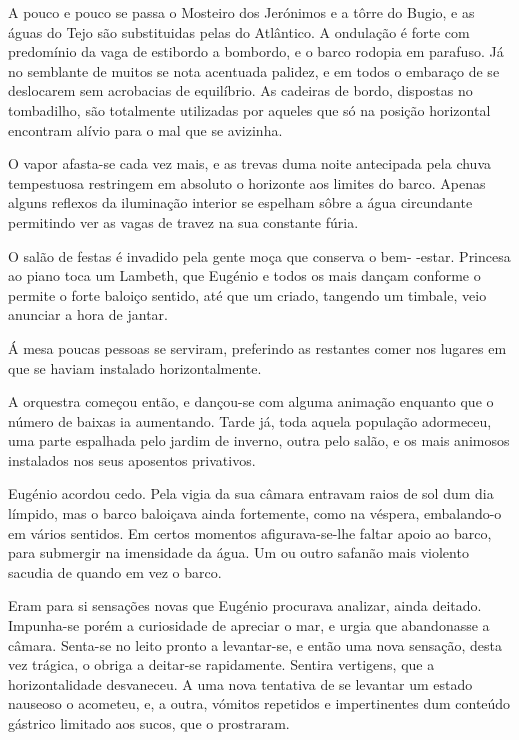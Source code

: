 \documentclass[9pt]{article}
\begin{document}
A pouco e pouco se passa o Mosteiro dos Jerónimos e a tôrre do Bugio, e
as águas do Tejo são substituidas pelas do Atlântico. A ondula\-ção é forte
com predomínio da vaga de estibordo a bombordo, e o barco rodopia em parafuso. Já no semblante de muitos se nota acen\-tua\-da palidez, e em todos o embaraço de se deslocarem sem acrobacias de equilíbrio. As cadeiras de bordo,
dispostas no tombadi\-lho, são totalmente utilizadas por aqueles que só na posi\-ção horizontal encontram alívio para o mal que se avizinha.

O vapor afasta-se cada vez mais, e as trevas duma noite antecipada pela
chuva tempestuosa restringem em absoluto o horizonte aos limites do barco.
Apenas alguns reflexos da ilumina\-ção interior se espe\-lham sôbre a água circundante permitindo ver as vagas de travez na sua constante fúria.

O salão de festas é invadido pela gente moça que conserva o bem- -estar. %
Princesa ao piano toca um Lambeth, que Eugé\-nio e todos os mais dan\-çam conforme o permite o forte baloiço sentido, até que um criado, tangendo um timbale,
veio anunciar a hora de jantar.

Á mesa poucas pessoas se serviram, preferindo as restantes comer nos
lugares em que se haviam instalado horizontalmente.

A orquestra começou então, e dançou-se com alguma anima\-ção enquanto que
o número de baixas ia aumentando. Tarde já, toda aquela popula\-ção adormeceu,
uma parte espa\-lhada pelo jardim de inverno, outra pelo salão, e os mais animosos
instalados nos seus aposentos privativos.

Eugé\-nio acordou cedo. Pela vigia da sua câmara entravam raios de sol
dum dia límpido, mas o barco baloiçava ainda fortemente, como na véspera, embalando-o em vários sentidos. Em certos momentos afigurava-se-\-lhe faltar
apoio ao barco, para submergir na imensidade da água. Um ou outro safanão
mais violento sacudia de quan\-do em vez o barco.

Eram para si sensa\-ções novas que Eugé\-nio procurava analizar, ainda deitado. Impunha-se porém a curiosidade de apreciar o mar, e urgia que abandonasse a câmara. Senta-se no leito pronto a levantar-se, e então uma nova
sensa\-ção, desta vez trágica, o obriga a deitar-se rapidamente. Sentira vertigens, que a horizontalidade desvaneceu. A uma nova tentativa de se levantar
um estado nauseoso o acometeu, e, a outra, vómitos repetidos e impertinentes
dum conteúdo gástrico limitado aos sucos, que o prostraram.
\end{document}
